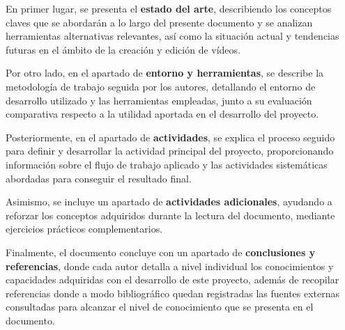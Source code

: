 En primer lugar, se presenta el \textbf{estado del arte}, describiendo los conceptos claves que 
se abordarán a lo largo del presente documento y se analizan herramientas alternativas 
relevantes, así como la situación actual y tendencias futuras en el ámbito de la creación y 
edición de vídeos.

Por otro lado, en el apartado de \textbf{entorno y herramientas}, se describe la metodología de trabajo 
seguida por los autores, detallando el entorno de desarrollo utilizado y las 
herramientas empleadas, junto a su evaluación comparativa respecto a la utilidad 
aportada en el desarrollo del proyecto.

Posteriormente, en el apartado de \textbf{actividades}, se explica el proceso seguido para definir y 
desarrollar la actividad principal del proyecto, proporcionando información sobre 
el flujo de trabajo aplicado y las actividades sistemáticas abordadas para conseguir 
el resultado final.

Asimismo, se incluye un apartado de \textbf{actividades adicionales}, ayudando a reforzar los 
conceptos adquiridos durante la lectura del documento, mediante ejercicios 
prácticos complementarios.

Finalmente, el documento concluye con un apartado de \textbf{conclusiones y referencias}, 
donde cada autor detalla a nivel individual los conocimientos y capacidades adquiridas 
con el desarrollo de este proyecto, además de recopilar referencias donde a modo bibliográfico 
quedan registradas las fuentes externas consultadas para alcanzar el nivel de conocimiento 
que se presenta en el documento.